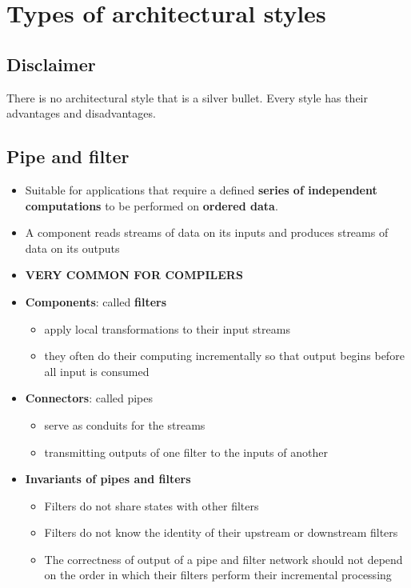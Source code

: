 \documentclass[12pt]{book}
\begin{document}
\section{Types of architectural styles}
\subsection{Disclaimer}
There is no architectural style that is a silver bullet. Every style has their advantages and disadvantages.
\subsection{Pipe and filter}

\begin{itemize}
    \item Suitable for applications that require a defined \textbf{series of independent computations} to be performed on \textbf{ordered data}. 
    \item A component reads streams of data on its inputs and produces streams of data on its outputs
    \item \textbf{VERY COMMON FOR COMPILERS}
    \item \textbf{Components}: called \textbf{filters}
    \begin{itemize}
        \item apply local transformations to their input streams
        \item they often do their computing incrementally so that output begins before all input is consumed
    \end{itemize} 

    \item \textbf{Connectors}: called pipes
    \begin{itemize}
        \item serve as conduits for the streams
        \item transmitting outputs of one filter to the inputs of another
    \end{itemize} 

    \item \textbf{Invariants of pipes and filters}
    \begin{itemize}
        \item Filters do not share states with other filters
        \item Filters do not know the identity of their upstream or downstream filters
        \item The correctness of output of a pipe and filter network should not depend on the order in which their filters perform their incremental processing
    \end{itemize} 


\end{itemize}
\end{document}
